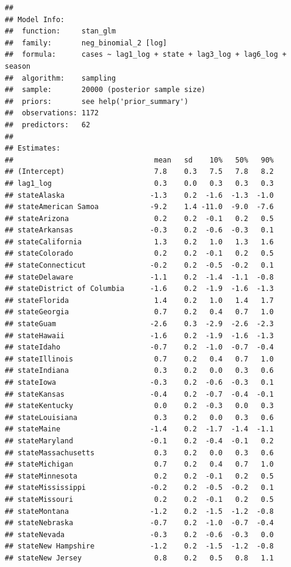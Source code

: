 \documentclass[
]{book}
\begin{document}
\begin{verbatim}
## 
## Model Info:
##  function:     stan_glm
##  family:       neg_binomial_2 [log]
##  formula:      cases ~ lag1_log + state + lag3_log + lag6_log + season
##  algorithm:    sampling
##  sample:       20000 (posterior sample size)
##  priors:       see help('prior_summary')
##  observations: 1172
##  predictors:   62
## 
## Estimates:
##                                 mean   sd    10%   50%   90%
## (Intercept)                     7.8    0.3   7.5   7.8   8.2
## lag1_log                        0.3    0.0   0.3   0.3   0.3
## stateAlaska                    -1.3    0.2  -1.6  -1.3  -1.0
## stateAmerican Samoa            -9.2    1.4 -11.0  -9.0  -7.6
## stateArizona                    0.2    0.2  -0.1   0.2   0.5
## stateArkansas                  -0.3    0.2  -0.6  -0.3   0.1
## stateCalifornia                 1.3    0.2   1.0   1.3   1.6
## stateColorado                   0.2    0.2  -0.1   0.2   0.5
## stateConnecticut               -0.2    0.2  -0.5  -0.2   0.1
## stateDelaware                  -1.1    0.2  -1.4  -1.1  -0.8
## stateDistrict of Columbia      -1.6    0.2  -1.9  -1.6  -1.3
## stateFlorida                    1.4    0.2   1.0   1.4   1.7
## stateGeorgia                    0.7    0.2   0.4   0.7   1.0
## stateGuam                      -2.6    0.3  -2.9  -2.6  -2.3
## stateHawaii                    -1.6    0.2  -1.9  -1.6  -1.3
## stateIdaho                     -0.7    0.2  -1.0  -0.7  -0.4
## stateIllinois                   0.7    0.2   0.4   0.7   1.0
## stateIndiana                    0.3    0.2   0.0   0.3   0.6
## stateIowa                      -0.3    0.2  -0.6  -0.3   0.1
## stateKansas                    -0.4    0.2  -0.7  -0.4  -0.1
## stateKentucky                   0.0    0.2  -0.3   0.0   0.3
## stateLouisiana                  0.3    0.2   0.0   0.3   0.6
## stateMaine                     -1.4    0.2  -1.7  -1.4  -1.1
## stateMaryland                  -0.1    0.2  -0.4  -0.1   0.2
## stateMassachusetts              0.3    0.2   0.0   0.3   0.6
## stateMichigan                   0.7    0.2   0.4   0.7   1.0
## stateMinnesota                  0.2    0.2  -0.1   0.2   0.5
## stateMississippi               -0.2    0.2  -0.5  -0.2   0.1
## stateMissouri                   0.2    0.2  -0.1   0.2   0.5
## stateMontana                   -1.2    0.2  -1.5  -1.2  -0.8
## stateNebraska                  -0.7    0.2  -1.0  -0.7  -0.4
## stateNevada                    -0.3    0.2  -0.6  -0.3   0.0
## stateNew Hampshire             -1.2    0.2  -1.5  -1.2  -0.8
## stateNew Jersey                 0.8    0.2   0.5   0.8   1.1

\end{verbatim}
\end{document}
